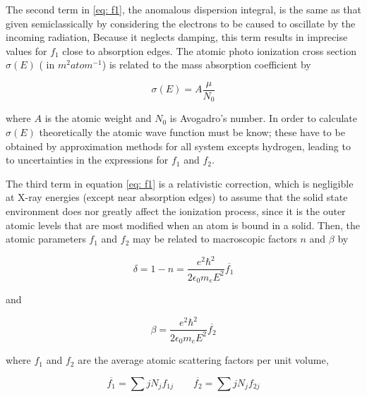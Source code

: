 \vspace{10 mm}
The second term in \ref{eq: f1}, the anomalous dispersion integral, is the same as that given semiclassically by considering the electrons to be caused to oscillate by the incoming radiation, Because it neglects damping, this term results in imprecise values for $f_1 $ close to absorption edges. The atomic photo ionization cross section $\sigma(E) $ ( in $m^2 atom ^{-1} $) is related to the mass absorption coefficient by 

\begin{equation}
\sigma(E) = A \frac{\mu}{N_0}
\label{eq: sigma}
\end{equation}

\begin{flushleft}
where $A $ is the atomic weight and $N_0 $ is Avogadro's number. In order to calculate $\sigma(E) $ theoretically the atomic wave function must be know; these have to be obtained by approximation methods for all system excepts hydrogen, leading to to uncertainties in the expressions for $f_1 $ and $f_2 $. 
\end{flushleft}
\vspace{10 mm} The third term in equation \ref{eq: f1} is a relativistic correction, which is negligible at X-ray energies (except near absorption edges) to assume that the solid state environment does nor greatly affect the ionization process, since it is the outer atomic levels that are most modified when an atom is bound in a solid. Then, the atomic parameters $f_1 $ and $f_2 $ may be related to macroscopic factors $n $ and $\beta $ by

\begin{equation}
\delta = 1 - n = \frac{e^2 \hbar^2}{2 \epsilon_0 m_e E^2} \overline{f_1}
\label{eq: delta}
\end{equation}

\begin{flushleft}
and
\end{flushleft}

\begin{equation}
\beta = \frac{e^2 \hbar^2}{2 \epsilon_0 m_e E^2} \overline{f_2}
\label{eq: beta}
\end{equation}

\begin{flushleft}
where $f_1 $ and $f_2 $ are the average atomic scattering factors per unit volume,
\end{flushleft}

\begin{equation}
\overline{f_1} = \sum{j} N_j f_{1j} \qquad \overline{f_2} = \sum{j} N_j f_{2j}
\label{f1, f2, mean}
\end{equation}

